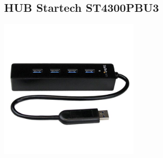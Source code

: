 \documentclass[a4paper,usenames,dvipsnames,svgnames,table]{book}
\begin{document}
\subsection{HUB Startech ST4300PBU3}


\begin{center}
\includegraphics[width=0.5\textwidth]{Figures/Hardware/Partes/ST4300PBU3.jpg}
\label{fig:Hardware:Partes:HUBST}
\end{center}
\end{document}
